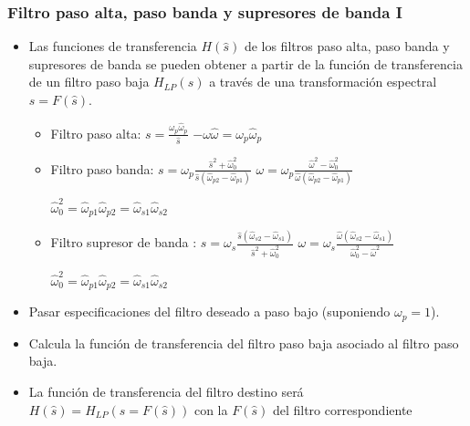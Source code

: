 \begin{frame}
\frametitle{Filtro paso alta, paso banda y supresores de banda I}

  \footnotesize
  \begin{itemize}
  \item Las funciones de transferencia $H(\hat s)$ de los filtros  paso alta, paso banda y supresores de banda se pueden obtener a partir de la función de transferencia de un filtro paso baja $H_{LP}(s)$ a través de una transformación espectral $s=F(\hat s)$.
  \begin{itemize}
    \footnotesize
    \item Filtro paso alta: \hspace{1.3cm}$s=\frac{\omega_p \hat \omega_p}{\hat s}$ \hspace{1.5cm} $-\omega \hat \omega=\omega_p \hat \omega_p$
    \item Filtro paso banda: \hspace{1.0cm} $s=\omega_p\frac{\hat s^2+\hat \omega_0^2}{\hat s (\hat \omega_{p2}-\hat \omega_{p1})}$
    \hspace{0.5cm}$\omega=\omega_p\frac{\hat\omega^2-\hat \omega_0^2}{\hat \omega (\hat \omega_{p2}-\hat \omega_{p1})}$

    \hspace{3.7cm}$\hat \omega_0^2=\hat \omega_{p1}\hat \omega_{p2}=\hat \omega_{s1}\hat \omega_{s2}$
    \item Filtro supresor de banda : $s=\omega_s\frac{\hat s (\hat \omega_{s2}-\hat \omega_{s1})}{\hat s^2+\hat \omega_0^2}$ \hspace{0.5cm}$\omega=\omega_s\frac{\hat \omega (\hat \omega_{s2}-\hat \omega_{s1})}{\hat \omega_0^2-\hat \omega^2}$

    \hspace{3.7cm}$\hat \omega_0^2=\hat \omega_{p1}\hat \omega_{p2}=\hat \omega_{s1}\hat \omega_{s2}$
  \end{itemize}

\item Pasar especificaciones del filtro deseado a paso bajo (suponiendo $\omega_p=1$).
\item Calcula la función de transferencia del filtro paso baja asociado al filtro paso baja.
\item La función de transferencia del filtro destino será $H(\hat s)=H_{LP}(s=F(\hat s))$ con la $F(\hat s)$ del filtro correspondiente
\end{itemize}

\end{frame}

